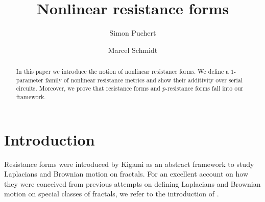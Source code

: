 \documentclass[a4paper,11pt,reqno]{amsart}
\theoremstyle{definition}
\numberwithin{equation}{section}
\newcommand{\1}{\mathds{1}}
\begin{document}


\title[Nonlinear Resistance forms]{Nonlinear resistance forms}


% 

\author{Simon Puchert}
\address{S. Puchert, Mathematisches Institut \\Friedrich-Schiller-Universität Jena \\07743 Jena, Germany } 

\author{Marcel Schmidt}
\address{M. Schmidt, Mathematisches Institut, Universität Leipzig, 04109 Leipzig, Germany.}  


\maketitle



\begin{abstract}
In this paper we introduce the notion of nonlinear resistance forms. We define a $1$-parameter family of nonlinear resistance metrics and show their additivity over serial circuits. Moreover, we prove that resistance forms and $p$-resistance forms fall into our framework. 
\end{abstract}







\section{Introduction}

Resistance forms were introduced by Kigami \cite{Kig01,Kig03} as an abstract framework to study Laplacians and Brownian motion on fractals. For an excellent account on how they were conceived from previous attempts on defining Laplacians and Brownian motion on special classes of fractals, we refer to the introduction of \cite{KS25}.
\end{document}
